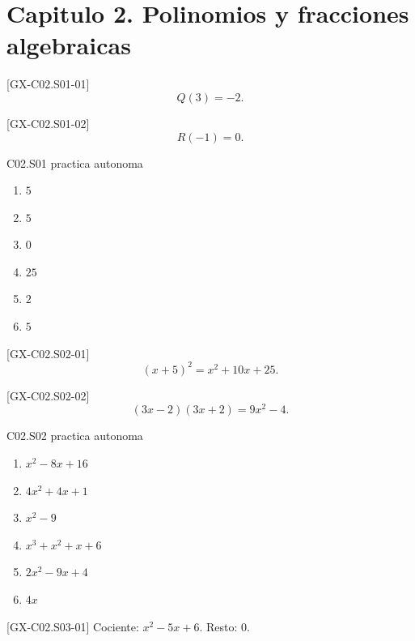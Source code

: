 \section*{Capitulo 2. Polinomios y fracciones algebraicas}

\begin{shortanswer}{[GX-C02.S01-01]}
\[
Q(3)=-2.
\]
\end{shortanswer}

\begin{shortanswer}{[GX-C02.S01-02]}
\[
R(-1)=0.
\]
\end{shortanswer}

\begin{shortanswer}{C02.S01 practica autonoma}
\begin{enumerate}[label=\textbf{PX-C02.S01-\arabic*:}, leftmargin=*]
  \item \(5\)
  \item \(5\)
  \item \(0\)
  \item \(25\)
  \item \(2\)
  \item \(5\)
\end{enumerate}
\end{shortanswer}

\begin{shortanswer}{[GX-C02.S02-01]}
\[
(x+5)^2=x^2+10x+25.
\]
\end{shortanswer}

\begin{shortanswer}{[GX-C02.S02-02]}
\[
(3x-2)(3x+2)=9x^2-4.
\]
\end{shortanswer}

\begin{shortanswer}{C02.S02 practica autonoma}
\begin{enumerate}[label=\textbf{PX-C02.S02-\arabic*:}, leftmargin=*]
  \item \(x^2-8x+16\)
  \item \(4x^2+4x+1\)
  \item \(x^2-9\)
  \item \(x^3+x^2+x+6\)
  \item \(2x^2-9x+4\)
  \item \(4x\)
\end{enumerate}
\end{shortanswer}

\begin{shortanswer}{[GX-C02.S03-01]}
Cociente: \(x^2-5x+6\). Resto: \(0\).
\end{shortanswer}

